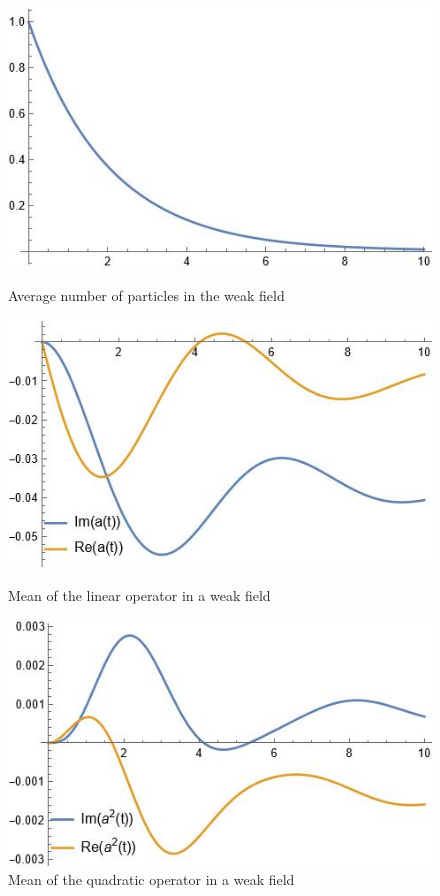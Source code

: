 \documentclass[12pt]{article}
\theoremstyle{definition}
\begin{document}
	\begin{figure}[h!]
		\begin{center}
			\begin{minipage}[h]{0.45\linewidth}
				\includegraphics[width=1\linewidth]{NWeakForce.JPG}
				\caption{Average number of particles in the weak field}
				\label{fig:weakforcen}
			\end{minipage}
			\hfil
			\begin{minipage}[h]{0.45\linewidth}
				\includegraphics[width=1\linewidth]{aWeakForce.JPG}
				\caption{Mean of the linear operator in a weak field}
				\label{fig:weakforcea}
			\end{minipage}
			\hfil
			\begin{minipage}[h]{0.45\linewidth}
				\includegraphics[width=1\linewidth]{a2WeakForce.JPG}
				\caption{Mean of the quadratic operator in a weak field}
				\label{fig:weakforceaa}
			\end{minipage}
		\end{center}
	\end{figure}
	
\end{document}
